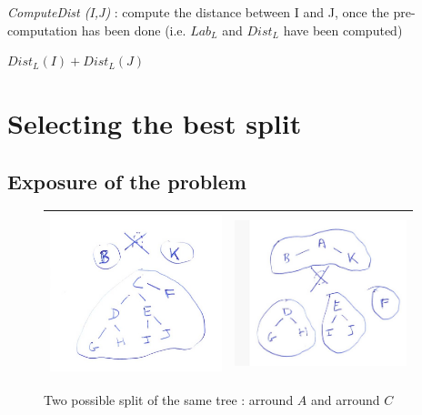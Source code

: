 \documentclass[a4paper]{article}
\begin{document}
\begin{algorithm}
\caption{{\it ComputeDist (I,J)} : compute the distance between I and J, once the pre-computation has been done (i.e. $Lab_L$ and $Dist_L$ have been computed)}
\begin{algorithmic}
       \STATE {}
    \ELSE
              \STATE \RETURN $Dist_L(I) + Dist_L(J)$
             \ENDIF
        \ENDFOR
    \ENDIF
\end{algorithmic}
\label{AlgoDistComp}
\end{algorithm}


\section{Selecting the best split}

\subsection{Exposure of the problem}
\label{SubSel}

\begin{figure}
\centering
\begin{tabular}{||c|c||}
 \hline \hline
\includegraphics[width=5cm]{FIGS/FTD-SplitA.jpg} &
\includegraphics[width=5cm]{FIGS/FTD-SplitC.jpg} 
 \\ \hline \hline
\end{tabular}
\caption{Two possible split of the same tree : arround $A$ and arround $C$}
\label{TreeSplit}
\end{figure}
\end{document}
